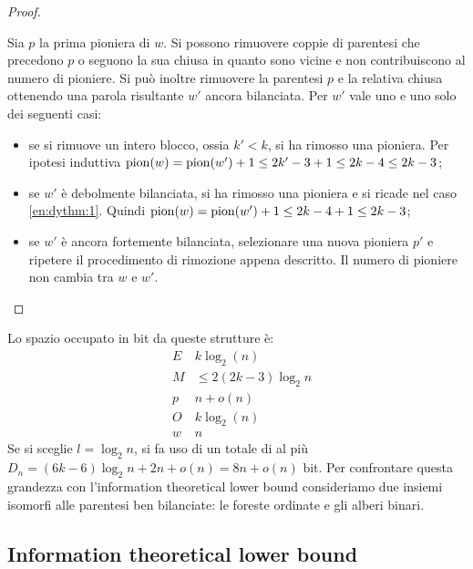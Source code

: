 \begin{proof}
\begin{itemize}
\begin{enumerate}
			            Sia $p$ la prima pioniera di $w$. Si possono rimuovere coppie di parentesi che precedono $p$ o seguono la sua chiusa in quanto sono vicine e non contribuiscono al numero di pioniere. Si può inoltre rimuovere la parentesi $p$ e la relativa chiusa ottenendo una parola risultante $w'$ ancora bilanciata. Per $w'$ vale uno e uno solo dei seguenti casi:
			            \begin{itemize}
				            \item se si rimuove un intero blocco, ossia $k'<k$, si ha rimosso una pioniera. Per ipotesi induttiva $\mathrm{pion}(w)=\mathrm{pion}(w')+1\leq 2k'-3+1\leq 2k-4\leq 2k-3$;
				            \item se $w'$ è debolmente bilanciata, si ha rimosso una pioniera e si ricade nel caso \ref{en:dythm:1}. Quindi $\mathrm{pion}(w)=\mathrm{pion}(w')+1\leq 2k-4+1\leq 2k-3$;
				            \item se $w'$ è ancora fortemente bilanciata, selezionare una nuova pioniera $p'$ e ripetere il procedimento di rimozione appena descritto. Il numero di pioniere non cambia tra $w$ e $w'$.
			            \end{itemize}
		      \end{enumerate}
	\end{itemize}
\end{proof}

Lo spazio occupato in bit da queste strutture è:
\begin{equation*}
	\begin{aligned}
		 & E & k  \log_2(n)         \\
		 & M & \leq 2(2k-3)\log_2 n \\
		 & p & n + o(n)             \\
		 & O & k  \log_2(n)         \\
		 & w & n
	\end{aligned}
\end{equation*}
Se si sceglie $l=\log_2 n$, si fa uso di un totale di al più $D_n=(6k-6)\log_2 n+2n+o(n)=8n+o(n)$ bit. Per confrontare questa grandezza con l'information theoretical lower bound consideriamo due insiemi isomorfi alle parentesi ben bilanciate: le foreste ordinate e gli alberi binari.


\subsection{Information theoretical lower bound}

